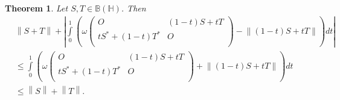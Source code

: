 \documentclass[12pt,twoside,reqno]{amsart}
\newtheorem{theorem}{Theorem}[section]
\numberwithin{equation}{section}
\begin{document}
\begin{theorem}\label{10}
Let $S,T\in \mathbb B\left( \mathbb H \right)$. Then
\[\begin{aligned}
  & \left\| S+T \right\|+\left| \int\limits_{0}^{1}{\left( \omega \left( \begin{matrix}
   O & \left( 1-t \right)S+tT  \\
   t{{S}^{*}}+\left( 1-t \right){{T}^{*}} & O  \\
\end{matrix} \right)-\left\| \left( 1-t \right)S+tT \right\| \right)dt} \right| \\ 
 & \le \int\limits_{0}^{1}{\left( \omega \left( \begin{matrix}
   O & \left( 1-t \right)S+tT  \\
   t{{S}^{*}}+\left( 1-t \right){{T}^{*}} & O  \\
\end{matrix} \right)+\left\| \left( 1-t \right)S+tT \right\| \right)dt} \\ 
 & \le \left\| S \right\|+\left\| T \right\|.
\end{aligned}\]
\end{theorem}
\end{document}
